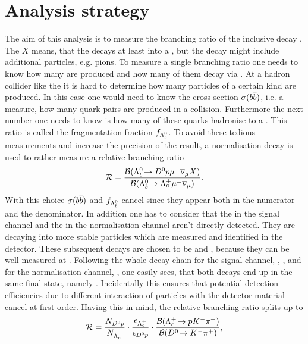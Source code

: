 \chapter{Analysis strategy}
\label{sec:Strategy}
The aim of this analysis is to measure the branching ratio of the inclusive decay \LbToDpmunuX.
The $X$ means, that the \Lb decays at least into a \Dz\proton\mun\neumb, but the decay might include additional particles, e.g. pions.
To measure a single branching ratio one needs to know how many \Lb are produced and how many of them decay via \LbToDpmunu.
At a hadron collider like the \lhc it is hard to determine how many particles of a certain kind are produced.
In this case one would need to know the \bquark\bquarkbar cross section $\sigma({b}{\overline {{b}}})$, i.e. a measure, how many \bquark\bquarkbar quark pairs are produced in a \proton\antiproton collision.
Furthermore the next number one needs to know is how many of these \bquark quarks hadronise to a \Lb.
This ratio is called the fragmentation fraction $f_{{{\Lambda}^0_{b}}}$.
To avoid these tedious measurements and increase the precision of the result, a normalisation decay \LbToLcmunu is used to rather measure a relative branching ratio
\begin{align}
	\mathcal{R} =
	\frac{{\cal B}({{\Lambda}^0_{b}}\!\rightarrow {\ensuremath{{D}^0}}{\ensuremath{p}} {\ensuremath{\mu^-}} {\ensuremath{{\overline{\nu}}_\mu}} X)}{{\cal B}({{\Lambda}^0_{b}}\!\rightarrow {\ensuremath{{\Lambda}^+_{c}}} {\ensuremath{\mu^-}}{\ensuremath{{\overline{\nu}}_\mu}})}. \label{eq:R_def}
\end{align}
With this choice $\sigma({b}{\overline {{b}}})$ and $f_{{{\Lambda}^0_{b}}}$ cancel since they appear both in the numerator and the denominator.
In addition one has to consider that the \Dz in the signal channel and the \Lc in the normalisation channel aren't directly detected.
They are decaying into more stable particles which are measured and identified in the detector.
These subsequent decays are chosen to be \DToKpi and \LcTopKpi, because they can be well measured at \lhcb.
Following the whole decay chain for the signal channel, \LbToDpmunuX, \DToKpi, and for the normalisation channel, \LbToLcmunu, \LcTopKpi one easily sees, that both decays end up in the same final state, namely \pKpi\mun\neumb.
Incidentally this ensures that potential detection efficiencies due to different interaction of particles with the detector material cancel at first order.
Having this in mind, the relative branching ratio splits up to
\begin{align}
	\mathcal{R} =
	 \frac{N_{{{D}^0}{p}}}{N_{{{\Lambda}^+_{c}}}}  
	 \cdot \frac{\epsilon_{{{\Lambda}^+_{c}}}}{\epsilon_{{{D}^0}{p}}}
	 \cdot \frac{{\cal B}({{\Lambda}^+_{c}}\!\rightarrow p {{K}^-} {{\pi}^+})}{{\cal B}({{D}^0}\!\rightarrow {\ensuremath{{K}^-}}{\ensuremath{{\pi}^+}})}, \label{eq:R}
\end{align}
